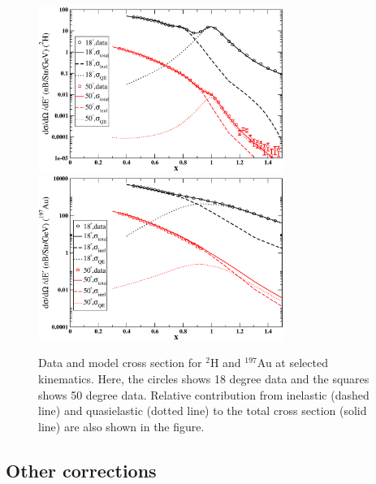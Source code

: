 \begin{figure}[htbp]
\begin{center}
\includegraphics[width=80mm, angle=0]{plots/ld2_model_example.eps}
\includegraphics[width=80mm, angle=0]{plots/au_model_example.eps}
\caption{Data and model cross section for $^2$H and $^{197}$Au at selected
kinematics. Here, the circles shows 18 degree data and the squares shows 50
degree data. Relative contribution from inelastic (dashed line) and
quasielastic (dotted line) to the total cross section (solid line) are also
shown in the figure.}\label{all_model_compare_fig}
\end{center}
\end{figure}

\subsection{Other corrections}\label{othercor.ssec}



